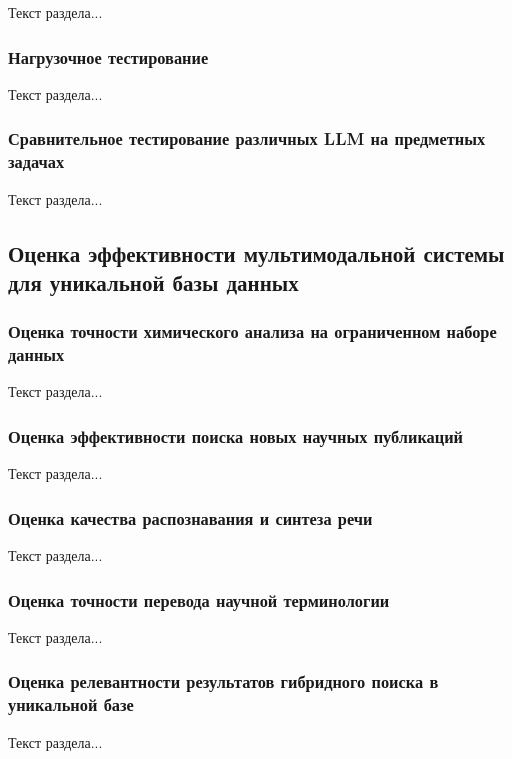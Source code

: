 Текст раздела...

\subsubsection{Нагрузочное тестирование}

Текст раздела...

\subsubsection{Сравнительное тестирование различных LLM на предметных задачах}

Текст раздела...

\subsection{Оценка эффективности мультимодальной системы для уникальной базы данных}

\subsubsection{Оценка точности химического анализа на ограниченном наборе данных}

Текст раздела...

\subsubsection{Оценка эффективности поиска новых научных публикаций}

Текст раздела...

\subsubsection{Оценка качества распознавания и синтеза речи}

Текст раздела...

\subsubsection{Оценка точности перевода научной терминологии}

Текст раздела...

\subsubsection{Оценка релевантности результатов гибридного поиска в уникальной базе}

Текст раздела...

